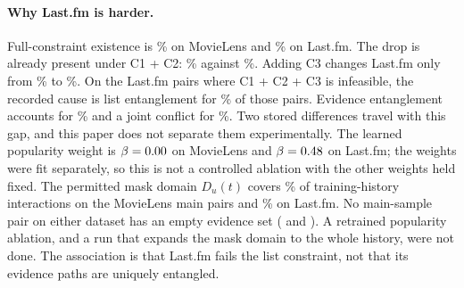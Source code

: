 \documentclass[11pt]{article}
\begin{document}
\paragraph{Why Last.fm is harder.} Full-constraint existence is \MLCExists\% on MovieLens and \LFCExists\% on
Last.fm. The drop is already present under C1 + C2: \MLBExists\% against \LFBExists\%. Adding C3 changes Last.fm
only from \LFBExists\% to \LFCExists\%. On the Last.fm pairs where C1 + C2 + C3 is infeasible, the recorded cause
is list entanglement for \LFCauseList\% of those pairs. Evidence entanglement accounts for \LFCauseEv\% and a joint conflict for \LFCauseJoint\%.
Two stored differences travel with this gap, and this paper does not separate them experimentally. The learned
popularity weight is $\beta=0.00$ on MovieLens and $\beta=0.48$ on Last.fm; the weights were fit separately,
so this is not a controlled ablation with the other weights held fixed. The permitted mask domain $D_u(t)$ covers
\MLScope\% of training-history interactions on the MovieLens main pairs and \LFScope\% on Last.fm. No main-sample
pair on either dataset has an empty evidence set (\MLEvFree{} and \LFEvFree{}). A retrained popularity ablation,
and a run that expands the mask domain to the whole history, were not done. The association is that Last.fm fails
the list constraint, not that its evidence paths are uniquely entangled.
\end{document}
